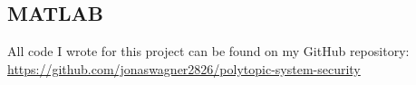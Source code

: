 \documentclass[]{article}
\begin{document}
\subsection{MATLAB}\label{apx:MATLAB}
All code I wrote for this project can be found on my GitHub repository:\\
\href{https://github.com/jonaswagner2826/polytopic-system-security}{https://github.com/jonaswagner2826/polytopic-system-security}\\
%
%
%
%
\end{document}
